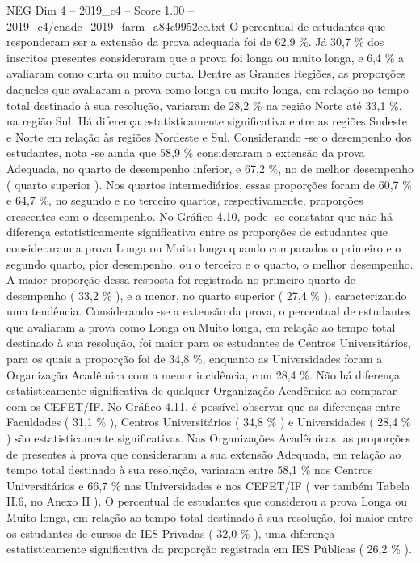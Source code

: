 \begin{textsample}{NEG Dim 4 – 2019\_c4 – Score 1.00 – 2019\_c4/enade\_2019\_farm\_a84c9952ee.txt}
O percentual de estudantes que responderam ser a extensão da prova adequada foi de 62,9 \%.
Já 30,7 \% dos inscritos presentes consideraram que a prova foi longa ou muito longa, e 6,4 \% a avaliaram como curta ou muito curta.
Dentre as Grandes Regiões, as proporções daqueles que avaliaram a prova como longa ou muito longa, em relação ao tempo total destinado à sua resolução, variaram de 28,2 \% na região Norte até 33,1 \%, na região Sul.
Há diferença estatisticamente significativa entre as regiões Sudeste e Norte em relação às regiões Nordeste e Sul.
Considerando -se o desempenho dos estudantes, nota -se ainda que 58,9 \% consideraram a extensão da prova Adequada, no quarto de desempenho inferior, e 67,2 \%, no de melhor desempenho ( quarto superior ).
Nos quartos intermediários, essas proporções foram de 60,7 \% e 64,7 \%, no segundo e no terceiro quartos, respectivamente, proporções crescentes com o desempenho.
No Gráfico 4.10, pode -se constatar que não há diferença estatisticamente significativa entre as proporções de estudantes que consideraram a prova Longa ou Muito longa quando comparados o primeiro e o segundo quarto, pior desempenho, ou o terceiro e o quarto, o melhor desempenho.
A maior proporção dessa resposta foi registrada no primeiro quarto de desempenho ( 33,2 \% ), e a menor, no quarto superior ( 27,4 \% ), caracterizando uma tendência.
Considerando -se a extensão da prova, o percentual de estudantes que avaliaram a prova como Longa ou Muito longa, em relação ao tempo total destinado à sua resolução, foi maior para os estudantes de Centros Universitários, para os quais a proporção foi de 34,8 \%, enquanto as Universidades foram a Organização Acadêmica com a menor incidência, com 28,4 \%.
Não há diferença estatisticamente significativa de qualquer Organização Acadêmica ao comparar com os CEFET/IF.
No Gráfico 4.11, é possível observar que as diferenças entre Faculdades ( 31,1 \% ), Centros Universitários ( 34,8 \% ) e Universidades ( 28,4 \% ) são estatisticamente significativas.
Nas Organizações Acadêmicas, as proporções de presentes à prova que consideraram a sua extensão Adequada, em relação ao tempo total destinado à sua resolução, variaram entre 58,1 \% nos Centros Universitários e 66,7 \% nas Universidades e nos CEFET/IF ( ver também Tabela II.6, no Anexo II ).
O percentual de estudantes que considerou a prova Longa ou Muito longa, em relação ao tempo total destinado à sua resolução, foi maior entre os estudantes de cursos de IES Privadas ( 32,0 \% ), uma diferença estatisticamente significativa da proporção registrada em IES Públicas ( 26,2 \% ).

\end{textsample}
